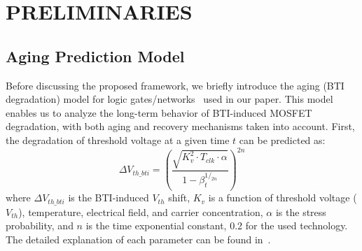 \chapter{PRELIMINARIES}
\label{sec:preliminary}

\section{Aging Prediction Model}
\label{subsec:apm}
Before discussing the proposed framework, we briefly introduce the aging (BTI degradation) model for logic gates/networks~\cite{wang2010impact, wang2007efficient, gomez2016early, amrouch2016reliability} used in our paper. This model enables us to analyze the long-term behavior of BTI-induced MOSFET degradation, with both aging and recovery mechanisms taken into account. First, the degradation of threshold voltage at a given time $t$ can be predicted as:
\begin{equation}
\label{eq:dtv}
\Delta V_{th\_bti}=\left(\frac{\sqrt{K_v^2 \cdot T_{clk} \cdot \alpha}}{1-\beta_t^{1/_{2n}}}\right)^{2n}
\end{equation}
where $\Delta V_{th\_bti}$ is the BTI-induced $V_{th}$ shift, $K_v$ is a function of threshold voltage ($V_{th}$), temperature, electrical field, and carrier concentration, $\alpha$ is the stress probability, and $n$ is the time exponential constant, 0.2 for the used technology. The detailed explanation of each parameter can be found in~\cite{wang2010impact}. 

